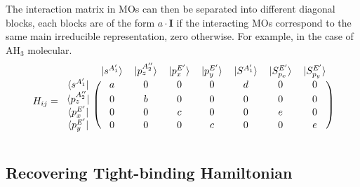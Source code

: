 \documentclass{article}
\begin{document}
The interaction matrix in MOs can then be separated into different diagonal blocks, each blocks are of the form $a\cdot \mathbf{I}$ if 
the interacting MOs correspond to the same main irreducible representation, zero otherwise.
For example, in the case of AH$_3$ molecular.
\begin{equation}
    H_{ij} = \begin{blockarray}{cccccccc}
        & |s^{A_1'}\rangle & |p_z^{A_2''}\rangle & |p_x^{E'}\rangle & |p_y^{E'}\rangle 
        & |S^{A_1'}\rangle & |S^{E'}_{p_x}\rangle & |S^{E'}_{p_y}\rangle \\
        \begin{block}{c(ccccccc)}
        \langle s^{A_1'}    |  & a & 0 & 0 & 0 & d & 0 & 0 \\
        \langle p_z^{A_2''} |  & 0 & b & 0 & 0 & 0 & 0 & 0 \\
        \langle p_x^{E'}    |  & 0 & 0 & c & 0 & 0 & e & 0 \\
        \langle p_y^{E'}    |  & 0 & 0 & 0 & c & 0 & 0 & e \\
        \end{block}
        \end{blockarray}
\end{equation}

\subsection{Recovering Tight-binding Hamiltonian}


 
\end{document}
